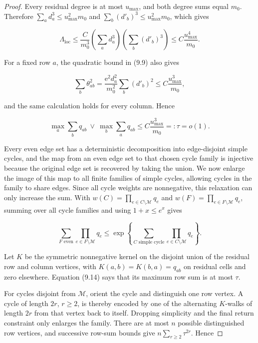 \documentclass[11pt,reqno]{amsart}
\newcommand{\displayheading}[1]{%
  \par\addvspace{0.68\baselineskip}%
  \noindent{\scshape #1.}\par\nobreak\smallskip\noindent}
\begin{document}
\begin{proof}
Every residual degree is at most \(u_{\max}\), and both degree sums equal
\(m_0\).  Therefore
\(\sum_a d_a^3\le u_{\max}^2m_0\) and
\(\sum_b(d'_b)^3\le u_{\max}^2m_0\), which gives

\[
 \Lambda_{\mathrm{loc}}\le\frac C{m_0^3}
   \left(\sum_a d_a^3\right)\left(\sum_b(d'_b)^3\right)
 \le C\frac{u_{\max}^4}{m_0}.                                  \tag{9.13}
\]

For a fixed row \(a\), the quadratic bound in (9.9) also gives

\[
 \sum_b\theta_{ab}^2
 =\frac{\mathrm{e}^2d_a^2}{m_0^2}\sum_b(d'_b)^2
 \le C\frac{u_{\max}^3}{m_0},
\]

and the same calculation holds for every column.  Hence

\[
 \max_a\sum_bq_{ab}\ \vee\ \max_b\sum_aq_{ab}
 \le C\frac{u_{\max}^3}{m_0}=:\tau=o(1).                       \tag{9.14}
\]

\displayheading{Cycle-kernel estimate}
Every even edge set has a deterministic decomposition into edge-disjoint
simple cycles, and the map from an even edge set to that chosen cycle family
is injective because the original edge set is recovered by taking the
union. We now enlarge the image of this map to all finite families of simple
cycles, allowing cycles in the family to share edges. Since all cycle
weights are nonnegative, this relaxation can only increase the sum.  With
\(w(C)=\prod_{e\in C\setminus \mathcal M}q_e\) and
\(w(F)=\prod_{e\in F\setminus \mathcal M}q_e\), summing over all cycle
families and using \(1+x\le e^x\) gives

\[
 \sum_{F\text{ even}}\prod_{e\in F\setminus \mathcal M}q_e
 \le\exp\left\{\sum_{C\text{ simple cycle}}
                  \prod_{e\in C\setminus \mathcal M}q_e\right\}. \tag{9.15}
\]

Let \(K\) be the symmetric nonnegative kernel on the disjoint union of the
residual row and column vertices, with
\(K(a,b)=K(b,a)=q_{ab}\) on residual cells and zero elsewhere.
Equation (9.14) says that its maximum row sum is at most \(\tau\).

For cycles disjoint from \(\mathcal M\), orient the cycle and distinguish
one row vertex. A cycle of length \(2r\), \(r\ge2\), is thereby encoded by
one of the alternating \(K\)-walks of length \(2r\) from that vertex back to
itself. Dropping simplicity and the final return constraint only enlarges
the family. There are at most \(n\) possible distinguished row vertices,
and successive row-sum bounds give \(n\sum_{r\ge2}\tau^{2r}\). Hence


\end{proof}
\end{document}
